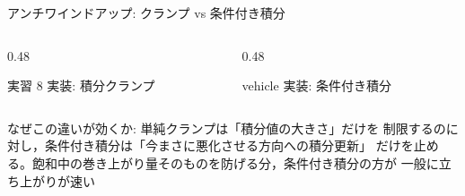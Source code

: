 \newlength{\antiwindupCardH}\setlength{\antiwindupCardH}{3.9cm}
\begin{frame}{アンチワインドアップ: クランプ vs 条件付き積分\later}
  \begin{columns}[T]
    \begin{column}{0.48\textwidth}
      \begin{block}{実習 8 実装: 積分クランプ}\footnotesize
      \end{block}
    \end{column}
    \begin{column}{0.48\textwidth}
      \begin{exampleblock}{vehicle 実装: 条件付き積分}\footnotesize
      \end{exampleblock}
    \end{column}
  \end{columns}

  \vspace{0.2em}

  {\footnotesize なぜこの違いが効くか: 単純クランプは「積分値の大きさ」だけを
  制限するのに対し，条件付き積分は「今まさに悪化させる方向への積分更新」
  だけを止める。飽和中の巻き上がり量そのものを防げる分，条件付き積分の方が
  一般に立ち上がりが速い}
\end{frame}

